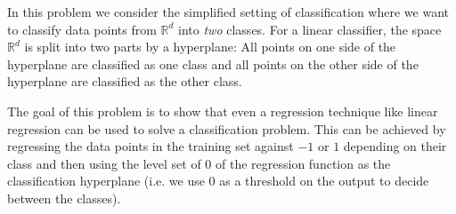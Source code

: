 \documentclass{article}\usepackage[utf8]{inputenc}\usepackage[margin=0.4cm,top=0.4cm,bottom=0.4cm]{geometry}\usepackage[usenames,dvipsnames,svgnames,table]{xcolor}
\begin{document}
\noindent In this problem we consider the simplified setting of classification where we want to classify data points from $\mathbb{R}^d$ into \textit{two} classes. For a linear classifier, the space $\mathbb{R}^d$ is split into two parts by a hyperplane: All points on one side of the hyperplane are classified as one class and all points on the other side of the hyperplane are classified as the other class.
\vspace{3pt}

\noindent The goal of this problem is to show that even a regression technique like linear regression can be used to solve a classification problem. This can be achieved by regressing the data points in the training set against $-1$ or $1$ depending on their class and then using the level set of 0 of the regression function as the classification hyperplane (i.e. we use 0 as a threshold on the output to decide between the classes).
\vspace{3pt}
\end{document}
